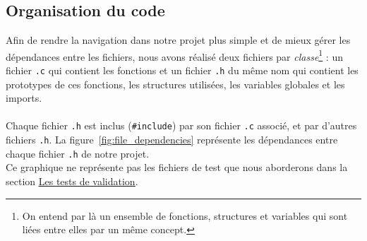 \subsection*{Organisation du code}
Afin de rendre la navigation dans notre projet plus simple et de mieux gérer les dépendances entre les fichiers, nous avons réalisé deux fichiers par \textit{classe}\footnote{On entend par là un ensemble de fonctions, structures et variables qui sont liées entre elles par un même concept.} : un fichier \texttt{.c} qui contient les fonctions et un fichier \texttt{.h} du même nom qui contient les prototypes de ces fonctions, les structures utilisées, les variables globales et les imports.\\ \\
Chaque fichier \texttt{.h} est inclus (\texttt{\#include}) par son fichier \texttt{.c} associé, et par d'autres fichiers \texttt{.h}.
La figure~\ref{fig:file_dependencies} représente les dépendances entre chaque fichier \texttt{.h} de notre projet.\\
Ce graphique ne représente pas les fichiers de test que nous aborderons dans la section \hyperref[sec:tests]{\uline{Les tests de validation}}.\\
